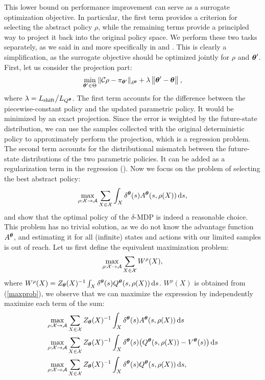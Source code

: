 \noindent This lower bound on performance improvement can serve as a surrogate optimization objective. In particular, the first term provides a criterion for selecting the abstract policy $\rho$, while the remaining terms provide a principled way to project it back into the original policy space. 
We perform these two tasks separately, as we said in  and more specifically in  and . This is clearly a simplification, as the surrogate objective should be optimized jointly for $\rho$ and $\vtheta'$. 
First, let us consider the projection part: 
\begin{align}\label{eq:proj}
\min_{\vtheta'\in\Theta} \norm[\delta^{\vtheta}]{\Conc\rho - \pi_{\vtheta'}} 
+ \lambda\norm{\vtheta'-\vtheta},
\end{align}
where $\lambda=L_{\text{shift}}\big/L_{Q^{\vtheta}}$. The first term accounts for the difference between the piecewise-constant policy and the updated parametric policy. It would be minimized by an exact projection. Since the error is weighted by the future-state distribution, we can use the samples collected with the original deterministic policy to approximately perform the projection, which is a regression problem. The second term accounts for the distributional mismatch between the future-state distributions of the two parametric policies. It can be added as a regularization term in the regression ().
%
Now we focus on the problem of selecting the best abstract policy: 
%
\begin{align}
\max_{\rho:\Xspace\to\Aspace}\sum_{X\in\Xspace}\int_{X}\delta^{\vtheta}(s)A^{\vtheta}(s,\rho(X)) \de s, \label{maxprob}
\end{align}
%
and show that the optimal policy of the $\delta$-\ac{MDP} is indeed a reasonable choice. This problem has no trivial solution, as we do not know the advantage function $A^{\vtheta}$, and estimating it for all (infinite) states and actions with our limited samples is out of reach. Let us first define the equivalent maximization problem:
\begin{align}\label{eq:W}
\max_{\rho:\Xspace\to\Aspace} \sum_{X\in\Xspace}W^{\rho}(X),
\end{align}
where $W^{\rho}(X) = Z_{\vtheta}(X)^{-1}\int_{X}\delta^{\vtheta}(s)Q^{\vtheta}(s,\rho(X))\de s$. $W^{\rho}(X)$ is obtained from (\ref{maxprob}), we observe that we can maximize the expression by independently maximize each term of the sum:
\begin{align}
	\max_{\rho:\Xspace\to\Aspace} &\sum_{X\in\Xspace}Z_{\vtheta}(X)^{-1}\int_{X}\delta^{\vtheta}(s)A^{\vtheta}(s,\rho(X)) \de s \label{max1}\\
	\max_{\rho:\Xspace\to\Aspace} &\sum_{X\in\Xspace}Z_{\vtheta}(X)^{-1}\int_{X}\delta^{\vtheta}(s)\big(Q^{\vtheta}(s,\rho(X))-V^{\vtheta}(s)\big) \de s \label{max2}\\
	\max_{\rho:\Xspace\to\Aspace} &\sum_{X\in\Xspace}Z_{\vtheta}(X)^{-1}\int_{X}\delta^{\vtheta}(s)Q^{\vtheta}(s,\rho(X)) \de s, \label{max3}
\end{align}
